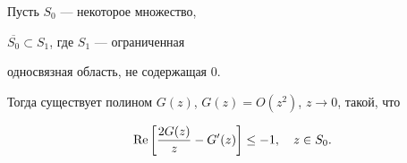 \begin{lem} Пусть $S_0$ --- некоторое множество,


$\overline{S_0} \subset S_1$, где $S_1$ --- ограниченная


односвязная область, не содержащая $0$.





Тогда существует полином $G(z)$, $G(z)=O(z^2)$, $z \to 0$, такой, что


$$


\re\bigg[\frac{2G(z)}{z}-G'(z)\bigg] \leq -1,\quad z \in S_0.


$$


\end{lem}





